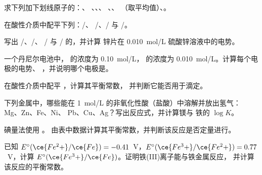\begin{exercise}[$\star$]\label{exo:b1:nernst:1}
求下列加下划线原子的：、
、、、
、、
（取平均值）、。
\end{exercise}

\begin{exercise}[$\star$]\label{exo:b1:nernst:2}
在酸性介质中配平下列：/、
/、/ 与 /。
\end{exercise}

\begin{exercise}[$\star$]\label{exo:b1:nernst:3}
写出 /、/、
/ 与 / 的，并计算
锌片在 \qty{0.010}{mol/L} 硫酸锌溶液中的电势。
\end{exercise}

\begin{exercise}[$\star$]\label{exo:b1:nernst:4}
一个丹尼尔电池中， 的浓度为 \qty{0.10}{mol/L}， 的浓度为
\qty{0.010}{mol/L}。计算每个电极的电势、
，并说明哪个电极是。
\end{exercise}

\begin{exercise}[$\star\star$]\label{exo:b1:nernst:5}
在酸性介质中配平 ，计算其平衡常数，
并判断它能否用于滴定。
\end{exercise}

\begin{exercise}[$\star\star$]\label{exo:b1:nernst:6}
下列金属中，哪些能在 \qty{1}{mol/L} 的非氧化性酸（盐酸）中溶解并放出氢气：
Mg、Zn、Fe、Ni、
Pb、Cu、Ag？写出反应式，并计算镁与
铁的 $\log K$。
\end{exercise}

\begin{exercise}[$\star\star$]\label{exo:b1:nernst:7}
碘量法使用 。
由表中数据计算其平衡常数，并判断该反应是否定量进行。
\end{exercise}

\begin{exercise}[$\star\star$]\label{exo:b1:nernst:8}
已知 $E^\circ(\ce{Fe^2+}/\ce{Fe}) = -0.41$~V，$E^\circ(\ce{Fe^3+}/\ce{Fe^2+})
= 0.77$~V，计算 $E^\circ(\ce{Fe^3+}/\ce{Fe})$。证明铁(III)离子能与铁金属反应，
并计算该反应的平衡常数。
\end{exercise}


